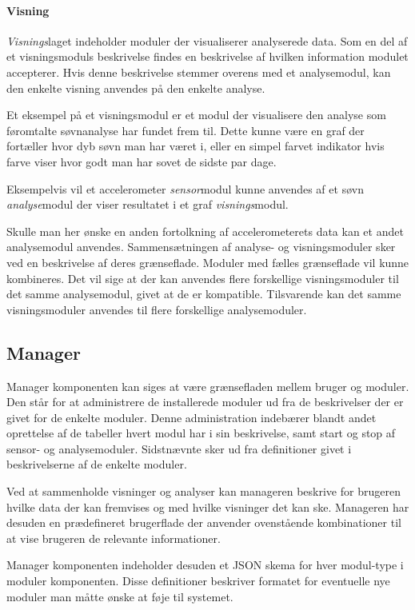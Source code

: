 \paragraph{Visning}
\textit{Visnings}laget indeholder moduler der visualiserer analyserede data.
Som en del af et visningsmoduls beskrivelse findes en beskrivelse af hvilken information modulet accepterer.
Hvis denne beskrivelse stemmer overens med et analysemodul, kan den enkelte visning anvendes på den enkelte analyse.

Et eksempel på et visningsmodul er et modul der visualisere den analyse som føromtalte søvnanalyse har fundet frem til.
Dette kunne være en graf der fortæller hvor dyb søvn man har været i, eller en simpel farvet indikator hvis farve viser hvor godt man har sovet de sidste par dage.

Eksempelvis vil et accelerometer \textit{sensor}modul kunne anvendes af et søvn \textit{analyse}modul der viser resultatet i et graf \textit{visnings}modul.

Skulle man her ønske en anden fortolkning af accelerometerets data kan et andet analysemodul anvendes.
Sammensætningen af analyse- og visningsmoduler sker ved en beskrivelse af deres grænseflade.
Moduler med fælles grænseflade vil kunne kombineres.
Det vil sige at der kan anvendes flere forskellige visningsmoduler til det samme analysemodul, givet at de er kompatible.
Tilsvarende kan det samme visningsmoduler anvendes til flere forskellige analysemoduler.

\subsection*{Manager}\label{subsec:arkitektur-Manager}
Manager komponenten kan siges at være grænsefladen mellem bruger og moduler.
Den står for at administrere de installerede moduler ud fra de beskrivelser der er givet for de enkelte moduler.
Denne administration indebærer blandt andet oprettelse af de tabeller hvert modul har i sin beskrivelse, samt start og stop af sensor- og analysemoduler.
Sidstnævnte sker ud fra definitioner givet i beskrivelserne af de enkelte moduler.

Ved at sammenholde visninger og analyser kan manageren beskrive for brugeren hvilke data der kan fremvises og med hvilke visninger det kan ske.
Manageren har desuden en prædefineret brugerflade der anvender ovenstående kombinationer til at vise brugeren de relevante informationer.

Manager komponenten indeholder desuden et JSON skema for hver modul-type i moduler komponenten.
Disse definitioner beskriver formatet for eventuelle nye moduler man måtte ønske at føje til systemet.

